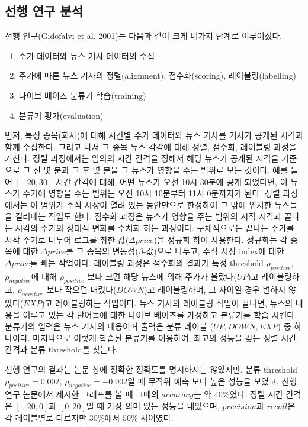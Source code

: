 \documentclass[a4paper,10pt]{article}
\begin{document}
\subsection{선행 연구 분석}

선행 연구(Gidofalvi et al. 2001)는 다음과 같이 크게 네가지 단계로 이루어졌다.
\begin{enumerate}
\item 주가 데이터와 뉴스 기사 데이터의 수집
\item 주가에 따른 뉴스 기사의 정렬(alignment), 점수화(scoring), 레이블링(labelling)
\item 나이브 베이즈 분류기 학습(training)
\item 분류기 평가(evaluation)
\end{enumerate}
먼저, 특정 종목(회사)에 대해 시간별 주가 데이터와 뉴스 기사를 기사가 공개된 시각과 함께 수집한다.
그리고 나서 그 종목 뉴스 각각에 대해 정렬, 점수화, 레이블링 과정을 거친다.
정렬 과정에서는 임의의 시간 간격을 정해서 해당 뉴스가 공개된 시각을 기준으로 그 전 몇 분과 그 후 몇 분을 그 뉴스가 영향을 주는 범위로 보는 것이다.
예를 들어 $[-20, 30]$ 시간 간격에 대해, 어떤 뉴스가 오전 10시 30분에 공개 되었다면, 이 뉴스가 주가에 영향을 주는 범위는 오전 10시 10분부터 11시 0분까지가 된다.
정렬 과정에서는 이 범위가 주식 시장이 열려 있는 동안만으로 한정하여 그 밖에 위치한 뉴스들을 걸러내는 작업도 한다.
점수화 과정은 뉴스가 영향을 주는 범위의 시작 시각과 끝나는 시각의 주가의 상대적 변화를 수치화 하는 과정이다.
구체적으로는 끝나는 주가를 시작 주가로 나누어 로그를 취한 값($\Delta price$)을 정규화 하여 사용한다.
정규화는 각 종목에 대한 $\Delta price$를 그 종목의 변동성($\beta$-값)으로 나누고, 주식 시장 index에 대한 $\Delta price$를 빼는 작업이다.
레이블링 과정은 점수화의 결과가 특정 threshold $\rho_{positive}$, $\rho_{negative}$에 대해
$\rho_{positive}$ 보다 크면 해당 뉴스에 의해 주가가 올랐다($UP$)고 레이블링하고,
$\rho_{negative}$ 보다 작으면 내렸다($DOWN$)고 레이블링하며,
그 사이일 경우 변하지 않았다($EXP$)고 레이블링하는 작업이다.
뉴스 기사의 레이블링 작업이 끝나면, 뉴스의 내용을 이루고 있는 각 단어들에 대한 나이브 베이즈를 가정하고 분류기를 학습 시킨다.
분류기의 입력은 뉴스 기사의 내용이며 출력은 분류 레이블 ($UP, DOWN, EXP$) 중 하나이다.
마지막으로 이렇게 학습된 분류기를 이용하여, 최고의 성능을 갖는 정렬 시간 간격과 분류 threshold를 찾는다.

선행 연구의 결과는 논문 상에 정확한 정확도를 명시하지는 않았지만,
분류 threshold $\rho_{positive}=0.002$, $\rho_{negative}=-0.002$일 때 무작위 예측 보다 높은 성능을 보였고,
선행 연구 논문에서 제시한 그래프를 볼 때 그때의 $accuracy$는 약 $40\%$였다.
정렬 시간 간격은 $[-20,0]$과 $[0,20]$일 때 가장 의미 있는 성능을 내었으며,
$precision$과 $recall$은 각 레이블별로 다르지만 $30\%$에서 $50\%$ 사이였다.
\end{document}
